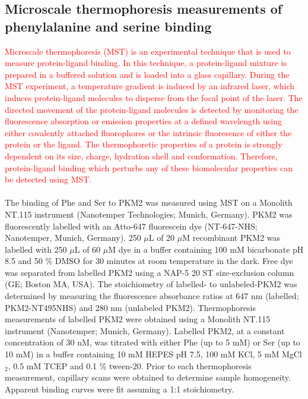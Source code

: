 \subsection{Microscale thermophoresis measurements of phenylalanine and serine binding}
\textcolor{red}{Microscale thermophoresis (MST) is an experimental technique that is used to measure protein-ligand binding. In this technique, a protein-ligand mixture is prepared in a buffered solution and is loaded into a glass capillary. During the MST experiment, a temperature gradient is induced by an infrared laser, which induces protein-ligand molecules to disperse from the focal point of the laser. The directed movement of the protein-ligand molecules is detected by monitoring the fluorescence absorption or emission properties at a defined wavelength using either covalently attached fluorophores or the intrinsic fluoresence of either the protein or the ligand. The thermophoretic properties of a protein is strongly dependent on its size, charge, hydration shell and conformation. Therefore, protein-ligand binding which perturbs any of these biomolecular properties can be detected using MST.}
%
%
\\
\\
%
%
The binding of Phe and Ser to PKM2 was measured using MST on a Monolith NT.115 instrument (Nanotemper Technologies; Munich, Germany). PKM2 was fluorescently labelled with an Atto-647 fluorescein dye (NT-647-NHS; Nanotemper, Munich, Germany). 250 $\mu$L of 20 $\mu$M recombinant PKM2 was labelled with 250 $\mu$L of 60 $\mu$M dye in a buffer containing 100 mM bicarbonate pH 8.5 and 50 \% DMSO for 30 minutes at room temperature in the dark. Free dye was separated from labelled PKM2 using a NAP-5 20 ST size-exclusion column (GE; Boston MA, USA). The stoichiometry of labelled- to unlabeled-PKM2 was determined by measuring the fluorescence absorbance ratios at 647 nm (labelled; PKM2-NT495NHS) and 280 nm (unlabeled PKM2). Thermophoresis measurements of labelled PKM2 were obtained using a Monolith NT.115 instrument (Nanotemper; Munich, Germany). Labelled PKM2, at a constant concentration of 30 nM, was titrated with either Phe (up to 5 mM) or Ser (up to 10 mM) in a buffer containing 10 mM HEPES pH 7.5, 100 mM KCl, 5 mM MgCl$_{2}$, 0.5 mM TCEP and 0.1 \% tween-20. Prior to each thermophoresis measurement, capillary scans were obtained to determine sample homogeneity. Apparent binding curves were fit assuming a 1:1 stoichiometry.

\clearpage

